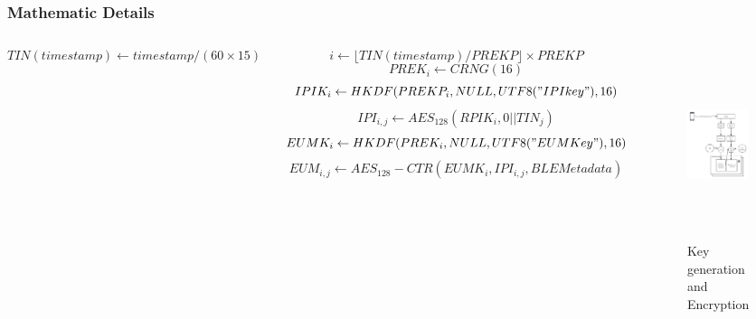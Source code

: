 \documentclass{beamer}
\begin{document}
\begin{frame}
  \frametitle{Mathematic Details}
  \begin{columns}[c]
    \small$$TIN(timestamp)\leftarrow timestamp/(60\times 15)$$
    
    $$i\leftarrow \lfloor TIN(timestamp)/PREKP\rfloor \times PREKP$$
    $$PREK_i\leftarrow CRNG(16)$$
    $$IPIK_i\leftarrow HKDF(PREKP_i,NULL,UTF8("IPIkey"), 16)$$
    $$IPI_{i,j}\leftarrow AES_{128}(RPIK_i,0||TIN_j)$$
    $$EUMK_i\leftarrow HKDF(PREK_i,NULL,UTF8("EUMKey"), 16)$$
    $$EUM_{i,j}\leftarrow AES_{128}-CTR(EUMK_i,IPI_{i,j},BLEMetadata)$$
    \begin{figure}[]
      \centering
      \includegraphics[height=1.3\textwidth]{figure/Tracking}
      \caption{Key generation and Encryption}
    \end{figure}
  \end{columns}

\end{frame}
\end{document}
